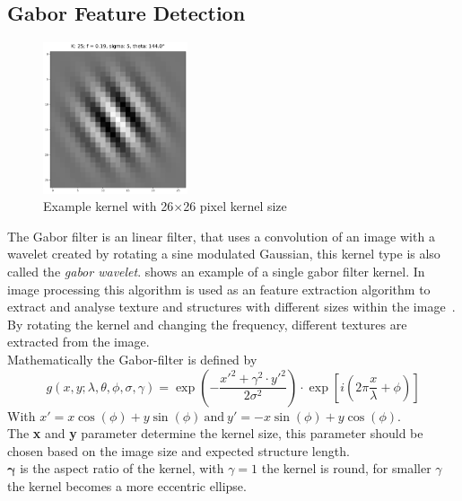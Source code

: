 \documentclass[12pt,a4paper, english,twoside]{scrartcl}
\begin{document}
  \subsection{Gabor Feature Detection}\label{sec:gabor}
    \begin{figure}
    \vspace{-1cm}
       \begin{center}
         \includegraphics[width=0.38\textwidth]{img/KLarge.png}
       \end{center}
       \caption{Example kernel with 26$\times$26 pixel kernel size}\label{fig:largeKernel}
      \end{figure}
    The Gabor filter is an linear filter, that uses a convolution of an image with a wavelet created by rotating a sine modulated Gaussian, this kernel type is also called the \textit{gabor wavelet}.
     shows an example of a single gabor filter kernel.
    In image processing this algorithm is used as an feature extraction algorithm to extract and analyse texture and structures with different sizes within the image~\autocite{Cerdan1993}. 
    By rotating the kernel and changing the frequency, different textures are extracted from the image.\\
    Mathematically the Gabor-filter is defined by
    \begin{equation}
      g(x,y; \lambda, \theta, \phi, \sigma, \gamma) = \exp \left(- \frac{x'^2 + \gamma^2\cdot y'^2}{2\sigma^2}\right) \cdot \exp \left[i \left(2\pi\frac{x}{\lambda} + \phi \right)\right] 
    \end{equation}
    With $ x' = x \cos(\phi) + y \sin(\phi)~\text{and}~y' = -x \sin(\phi) + y \cos(\phi)$.\\ 
    The \textbf{x} and \textbf{y} parameter determine the kernel size, this parameter should be chosen based on the image size and expected structure length.\\
    $\boldsymbol{\gamma}$ is the aspect ratio of the kernel, with $\gamma = 1$ the kernel is round, for smaller $\gamma$ the kernel becomes a more eccentric ellipse.\\
\end{document}
